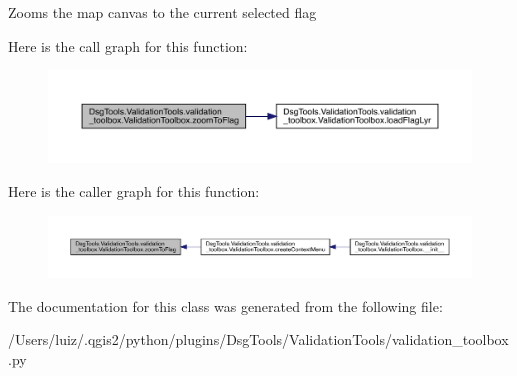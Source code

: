 \begin{DoxyVerb}Zooms the map canvas to the current selected flag
\end{DoxyVerb}
 Here is the call graph for this function\+:
\nopagebreak
\begin{figure}[H]
\begin{center}
\leavevmode
\includegraphics[width=350pt]{class_dsg_tools_1_1_validation_tools_1_1validation__toolbox_1_1_validation_toolbox_a52675cb46cbc4393a3fc4bbbef3cbc0e_cgraph}
\end{center}
\end{figure}
Here is the caller graph for this function\+:
\nopagebreak
\begin{figure}[H]
\begin{center}
\leavevmode
\includegraphics[width=350pt]{class_dsg_tools_1_1_validation_tools_1_1validation__toolbox_1_1_validation_toolbox_a52675cb46cbc4393a3fc4bbbef3cbc0e_icgraph}
\end{center}
\end{figure}


The documentation for this class was generated from the following file\+:\begin{DoxyCompactItemize}
\item 
/\+Users/luiz/.\+qgis2/python/plugins/\+Dsg\+Tools/\+Validation\+Tools/validation\+\_\+toolbox.\+py\end{DoxyCompactItemize}

